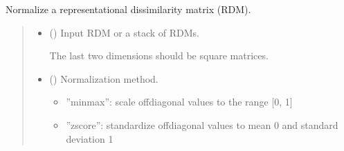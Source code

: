 \documentclass[letterpaper,10pt,english]{sphinxhowto}
\begin{document}
\begin{fulllineitems}
\label{\detokenize{stuff:neurora.stuff.normalize_rdm}}
\pysigstartsignatures
{}
\pysigstopsignatures
\sphinxAtStartPar
Normalize a representational dissimilarity matrix (RDM).
\begin{quote}\begin{description}
\begin{itemize}
\item {} 
\sphinxAtStartPar
{} (\sphinxstyleliteralemphasis{\sphinxupquote{, }}\sphinxstyleliteralemphasis{\sphinxupquote{ {[}}}\sphinxstyleliteralemphasis{\sphinxupquote{, }}\sphinxstyleliteralemphasis{\sphinxupquote{{]} or }}\sphinxstyleliteralemphasis{\sphinxupquote{{[}}}\sphinxstyleliteralemphasis{\sphinxupquote{, }}\sphinxstyleliteralemphasis{\sphinxupquote{, }}\sphinxstyleliteralemphasis{\sphinxupquote{{]}}}) \textendash{} 
\sphinxAtStartPar
Input RDM or a stack of RDMs.

\sphinxAtStartPar
The last two dimensions should be square matrices.


\item {} 
\sphinxAtStartPar
{} (\sphinxstyleliteralemphasis{\sphinxupquote{, }}\sphinxstyleliteralemphasis{\sphinxupquote{, }}) \textendash{} 
\sphinxAtStartPar
Normalization method.
\begin{itemize}
\item {} 
\sphinxAtStartPar
”minmax”: scale off\sphinxhyphen{}diagonal values to the range {[}0, 1{]}

\item {} 
\sphinxAtStartPar
”zscore”: standardize off\sphinxhyphen{}diagonal values to mean 0 and standard deviation 1


\end{itemize}
\end{itemize}
\end{description}
\end{quote}
\end{fulllineitems}
\end{document}
